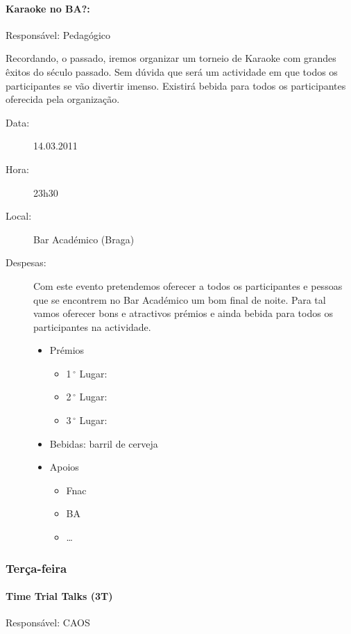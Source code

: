 \paragraph{Karaoke no BA?:}
Responsável: Pedagógico

Recordando, o passado, iremos organizar um torneio de Karaoke com grandes êxitos do século passado. Sem dúvida que será um actividade em que todos os participantes se vão divertir imenso. Existirá bebida para todos os participantes oferecida pela organização.

\begin{description}
	\item[Data:] 14.03.2011
	\item[Hora:] 23h30
	\item[Local:] Bar Académico (Braga)
	\item[Despesas:] Com este evento pretendemos oferecer a todos os participantes e pessoas que se encontrem no Bar Académico um bom final de noite. Para tal vamos oferecer bons e atractivos prémios e ainda bebida para todos os participantes na actividade.
	\begin{itemize}
		\item Prémios
		\begin{itemize}
			\item 1$\,^{\circ}$ Lugar:
			\item 2$\,^{\circ}$ Lugar:
			\item 3$\,^{\circ}$ Lugar:
		\end{itemize}
		\item Bebidas: barril de cerveja
		\item Apoios
		\begin{itemize}
			\item Fnac
			\item BA
			\item \dots  
		\end{itemize}
	\end{itemize}
\end{description}


\subsubsection*{Terça-feira}

\paragraph{Time Trial Talks (3T)}
Responsável: CAOS

